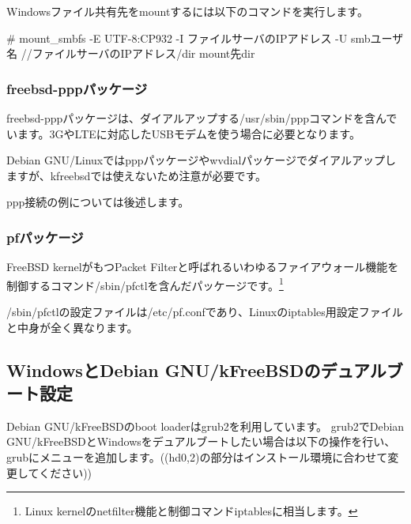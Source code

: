 \documentclass[mingoth,a4paper]{jsarticle}
\begin{document}
Windowsファイル共有先をmountするには以下のコマンドを実行します。

\begin{commandline}
# mount_smbfs -E UTF-8:CP932 -I {ファイルサーバのIPアドレス} -U {smbユーザ名} //{ファイルサーバのIPアドレス}/{dir} {mount先dir}
\end{commandline}

\subsubsection{freebsd-pppパッケージ}

freebsd-pppパッケージは、ダイアルアップする/usr/sbin/pppコマンドを含んでいます。3GやLTEに対応したUSBモデムを使う場合に必要となります。

Debian GNU/Linuxではpppパッケージやwvdialパッケージでダイアルアップしますが、kfreebsdでは使えないため注意が必要です。

ppp接続の例については後述します。

\subsubsection{pfパッケージ}

FreeBSD kernelがもつPacket Filterと呼ばれるいわゆるファイアウォール機能を制御するコマンド/sbin/pfctlを含んだパッケージです。\footnote{Linux kernelのnetfilter機能と制御コマンドiptablesに相当します。}

/sbin/pfctlの設定ファイルは/etc/pf.confであり、Linuxのiptables用設定ファイルと中身が全く異なります。

\subsection{WindowsとDebian GNU/kFreeBSDのデュアルブート設定}

Debian GNU/kFreeBSDのboot loaderはgrub2を利用しています。
grub2でDebian GNU/kFreeBSDとWindowsをデュアルブートしたい場合は以下の操作を行い、grubにメニューを追加します。((hd0,2)の部分はインストール環境に合わせて変更してください))

\end{document}
